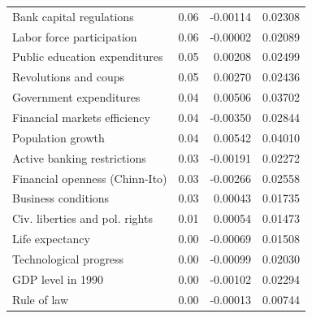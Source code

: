 \begin{refsection}
\begin{subappendices}
\begin{table}[!ht]
\begin{tabular}{lrrr}
      Bank capital regulations & 0.06 & -0.00114 & 0.02308 \\ 
      Labor force participation & 0.06 & -0.00002 & 0.02089 \\ 
      Public education expenditures & 0.05 & 0.00208 & 0.02499 \\ 
      Revolutions and coups & 0.05 & 0.00270 & 0.02436 \\ 
      Government expenditures & 0.04 & 0.00506 & 0.03702 \\ 
      Financial markets efficiency & 0.04 & -0.00350 & 0.02844 \\ 
      Population growth & 0.04 & 0.00542 & 0.04010 \\ 
      Active banking restrictions & 0.03 & -0.00191 & 0.02272 \\ 
      Financial openness (Chinn-Ito) & 0.03 & -0.00266 & 0.02558 \\ 
      Business conditions & 0.03 & 0.00043 & 0.01735 \\ 
      Civ. liberties and pol. rights & 0.01 & 0.00054 & 0.01473 \\ 
      Life expectancy & 0.00 & -0.00069 & 0.01508 \\ 
      Technological progress & 0.00 & -0.00099 & 0.02030 \\ 
      GDP level in 1990 & 0.00 & -0.00102 & 0.02294 \\ 
      Rule of law & 0.00 & -0.00013 & 0.00744 \\
      \bottomrule
    \end{tabular}
    \end{table}
    
    \clearpage
    

\end{subappendices}
\end{refsection}
